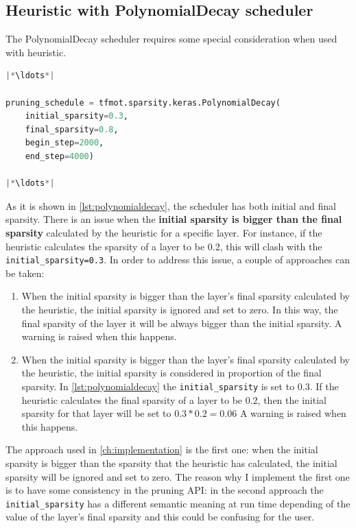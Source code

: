 \subsection{Heuristic with PolynomialDecay scheduler}
The PolynomialDecay scheduler requires some special consideration when used
with heuristic.

\begin{lstlisting}[language=Python, label={lst:polynomialdecay},
    caption=PolynomialDecay Scheduler in TFMOT]
|*\ldots*|

pruning_schedule = tfmot.sparsity.keras.PolynomialDecay(
    initial_sparsity=0.3,
    final_sparsity=0.8,
    begin_step=2000,
    end_step=4000)

|*\ldots*|
\end{lstlisting}

As it is shown in \autoref{lst:polynomialdecay}, the scheduler has both initial
and final sparsity.
There is an issue when the \textbf{initial sparsity is bigger than the final
sparsity} calculated by the heuristic for a specific layer.
For instance, if the heuristic calculates the sparsity of a layer to be 0.2,
this will clash with the \texttt{initial\_sparsity=0.3}.
In order to address this issue, a couple of approaches can be taken:

\begin{enumerate}
    \item When the initial sparsity is bigger than the layer's final sparsity
        calculated by the heuristic, the initial sparsity is ignored and set to
        zero. In this way, the final sparsity of the layer it will be always
        bigger than the initial sparsity. A warning is raised when this
        happens.
    \item When the initial sparsity is bigger than the layer's final sparsity
        calculated by the heuristic, the initial sparsity is considered in
        proportion of the final sparsity. In \autoref{lst:polynomialdecay} the
        \texttt{initial\_sparsity} is set to 0.3. If the heuristic calculates
        the final sparsity of a layer to be 0.2, then the initial sparsity for
        that layer will be set to $0.3 * 0.2 = 0.06$
        A warning is raised when this happens.
\end{enumerate}

The approach used in \autoref{ch:implementation} is the first one: when the
initial sparsity is bigger than the sparsity that the heuristic has calculated,
the initial sparsity will be ignored and set to zero.
The reason why I implement the first one is to have some consistency in the
pruning API\@: in the second approach the \texttt{initial\_sparsity} has a
different semantic meaning at run time depending of the value of the layer's
final sparsity and this could be confusing for the user.
